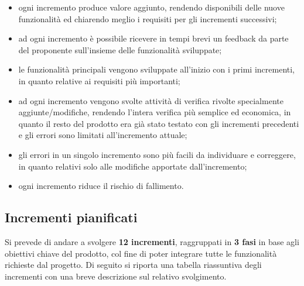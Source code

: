 	\begin{itemize}
		\item ogni incremento produce valore aggiunto, rendendo disponibili delle nuove funzionalità ed chiarendo meglio i requisiti per gli incrementi successivi;
		\item ad ogni incremento è possibile ricevere in tempi brevi un feedback da parte del proponente sull'insieme delle funzionalità sviluppate;
		\item le funzionalità principali vengono sviluppate all'inizio con i primi incrementi, in quanto relative ai requisiti più importanti;
		\item ad ogni incremento vengono svolte attività di verifica rivolte specialmente aggiunte/modifiche, rendendo l'intera verifica più semplice ed economica, in quanto il resto del prodotto era già stato testato con gli incrementi precedenti e gli errori sono limitati all'incremento attuale;
		\item gli errori in un singolo incremento sono più facili da individuare e correggere, in quanto relativi solo alle modifiche apportate dall'incremento;
		\item ogni incremento riduce il rischio di fallimento.
	\end{itemize}

\subsection{Incrementi pianificati}

Si prevede di andare a svolgere \textbf{12 incrementi}, raggruppati in \textbf{3 fasi} in base agli obiettivi chiave del prodotto, col fine di poter integrare tutte le funzionalità richieste dal progetto. Di seguito si riporta una tabella riassuntiva degli incrementi con una breve descrizione sul relativo svolgimento.

